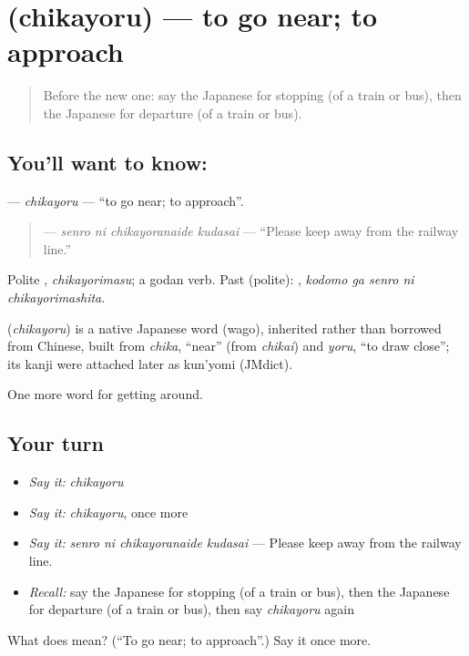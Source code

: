 \section[\texorpdfstring{\ja{ちかよる} (chikayoru)}{ちかよる (chikayoru)}]{ (chikayoru) — to go near; to approach}

\label{lesson:JA-C374-chikayoru}



\begin{quote}
Before the new one: say the Japanese for stopping (of a train or bus), then the Japanese for departure (of a train or bus).
\end{quote}

\subsection*{You'll want to know: }
\textbf{} — \emph{chikayoru} — \textquotedblleft{}to go near; to approach\textquotedblright{}.

\begin{quote}
\textbf{  } — \emph{senro ni chikayoranaide kudasai} — \textquotedblleft{}Please keep away from the railway line.\textquotedblright{}
\end{quote}

Polite \textbf{}, \emph{chikayorimasu}; a godan verb. Past (polite): \textbf{  }, \emph{kodomo ga senro ni chikayorimashita}.

\begin{cousinweb}
\textbf{} (\emph{chikayoru}) is a native Japanese word (wago), inherited rather than borrowed from Chinese, built from \emph{chika}, \textquotedblleft{}near\textquotedblright{} (from \emph{chikai}) and \emph{yoru}, \textquotedblleft{}to draw close\textquotedblright{}; its kanji were attached later as kun'yomi (JMdict).
\end{cousinweb}

\begin{grammarlens}[title={What you've built}]
One more word for getting around.
\end{grammarlens}

\subsection*{Your turn}
\begin{itemize}
\raggedright
  \item \emph{Say it:} \emph{chikayoru}
  \item \emph{Say it:} \emph{chikayoru}, once more
  \item \emph{Say it:} \emph{senro ni chikayoranaide kudasai} — Please keep away from the railway line.
  \item \emph{Recall:} say the Japanese for stopping (of a train or bus), then the Japanese for departure (of a train or bus), then say \emph{chikayoru} again
\end{itemize}

\begin{tcolorbox}[breakable,colback=teal!4,colframe=teal!35!black,title={Before you move on}]
What does  mean? (\textquotedblleft{}To go near; to approach\textquotedblright{}.) Say it once more.
\end{tcolorbox}
